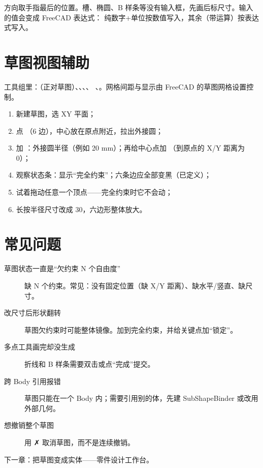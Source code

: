方向取手指最后的位置。槽、椭圆、B 样条等没有输入框，先画后标尺寸。输入的值会变成 FreeCAD 表达式：
纯数字+单位按数值写入，其余（带运算）按表达式写入。

\section{草图视图辅助}

 工具组里：（正对草图）、、、、
、。网格间距与显示由 FreeCAD 的草图网格设置控制。

\begin{practice}[练习：完全约束的六边形]
\begin{enumerate}
  \item 新建草图，选 XY 平面；
  \item 点 （6 边），中心放在原点附近，拉出外接圆；
  \item 加 ：外接圆半径（例如 20 mm）；再给中心点加 （到原点的 X/Y 距离为 0）；
  \item 观察状态条：显示“完全约束”；六条边应全部变黑（已定义）；
  \item 试着拖动任意一个顶点——完全约束时它不会动；
  \item 长按半径尺寸改成 30，六边形整体放大。
\end{enumerate}
\end{practice}

\section{常见问题}

\begin{description}
  \item[草图状态一直是“欠约束 N 个自由度”] 缺 N 个约束。常见：没有固定位置（缺 X/Y 距离）、缺水平/竖直、缺尺寸。
  \item[改尺寸后形状翻转] 草图欠约束时可能整体镜像。加到完全约束，并给关键点加“锁定”。
  \item[多点工具画完却没生成] 折线和 B 样条需要双击或点“完成”提交。
  \item[跨 Body 引用报错] 草图只能在一个 Body 内；需要引用别的体，先建 SubShapeBinder 或改用外部几何。
  \item[想撤销整个草图] 用 ✗ 取消草图，而不是连续撤销。
\end{description}

下一章：把草图变成实体——零件设计工作台。
